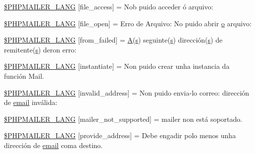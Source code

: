 \begin{DoxyCompactItemize}
\item 
\hyperlink{phpmailer_8lang-gl_8php_a7e83349023b856ef9e5c46e30ae6d51e}{\$\+P\+H\+P\+M\+A\+I\+L\+E\+R\+\_\+\+L\+A\+NG} \mbox{[}\textquotesingle{}file\+\_\+access\textquotesingle{}\mbox{]} = \textquotesingle{}Nob puido acceder ó arquivo\+: \textquotesingle{}
\item 
\hyperlink{phpmailer_8lang-gl_8php_a28d1a6517bf4c942a0ddd506188ad2e0}{\$\+P\+H\+P\+M\+A\+I\+L\+E\+R\+\_\+\+L\+A\+NG} \mbox{[}\textquotesingle{}file\+\_\+open\textquotesingle{}\mbox{]} = \textquotesingle{}Erro de Arquivo\+: No puido abrir \hyperlink{fullpage_2plugin_8min_8js_a4afc7c854f61c136d7bcfa8997651b88}{o} arquivo\+: \textquotesingle{}
\item 
\hyperlink{phpmailer_8lang-gl_8php_adf832ae12155a09be077c6d5e4fd7e22}{\$\+P\+H\+P\+M\+A\+I\+L\+E\+R\+\_\+\+L\+A\+NG} \mbox{[}\textquotesingle{}from\+\_\+failed\textquotesingle{}\mbox{]} = \textquotesingle{}\hyperlink{_chart_8min_8js_a9757042cb6157b0f84e78a5ff4aa6f93}{A}(\hyperlink{paste_2plugin_8min_8js_a43ae144ee2a4e493fea41ca42f795b14}{s}) seguinte(\hyperlink{paste_2plugin_8min_8js_a43ae144ee2a4e493fea41ca42f795b14}{s}) dirección(\hyperlink{paste_2plugin_8min_8js_a43ae144ee2a4e493fea41ca42f795b14}{s}) de remitente(\hyperlink{paste_2plugin_8min_8js_a43ae144ee2a4e493fea41ca42f795b14}{s}) deron erro\+: \textquotesingle{}
\item 
\hyperlink{phpmailer_8lang-gl_8php_ad58dde16780f4770ccf4dd282ea1f5ad}{\$\+P\+H\+P\+M\+A\+I\+L\+E\+R\+\_\+\+L\+A\+NG} \mbox{[}\textquotesingle{}instantiate\textquotesingle{}\mbox{]} = \textquotesingle{}Non puido crear unha instancia da función Mail.\textquotesingle{}
\item 
\hyperlink{phpmailer_8lang-gl_8php_a42d61bcea4c79599ecb44fd062f54d47}{\$\+P\+H\+P\+M\+A\+I\+L\+E\+R\+\_\+\+L\+A\+NG} \mbox{[}\textquotesingle{}invalid\+\_\+address\textquotesingle{}\mbox{]} = \textquotesingle{}Non puido envia-\/lo correo\+: dirección de \hyperlink{actions_2account_8php_a011c66ae212438e0d7de7c0e40451bb3}{email} inválida\+: \textquotesingle{}
\item 
\hyperlink{phpmailer_8lang-gl_8php_aa2ebcb8833ee83a7ad67401c4bb3a6ad}{\$\+P\+H\+P\+M\+A\+I\+L\+E\+R\+\_\+\+L\+A\+NG} \mbox{[}\textquotesingle{}mailer\+\_\+not\+\_\+supported\textquotesingle{}\mbox{]} = \textquotesingle{} mailer non está soportado.\textquotesingle{}
\item 
\hyperlink{phpmailer_8lang-gl_8php_a8b97897c2406b7392b056f375feeefbb}{\$\+P\+H\+P\+M\+A\+I\+L\+E\+R\+\_\+\+L\+A\+NG} \mbox{[}\textquotesingle{}provide\+\_\+address\textquotesingle{}\mbox{]} = \textquotesingle{}Debe engadir polo menos unha dirección de \hyperlink{actions_2account_8php_a011c66ae212438e0d7de7c0e40451bb3}{email} coma destino.\textquotesingle{}

\end{DoxyCompactItemize}
